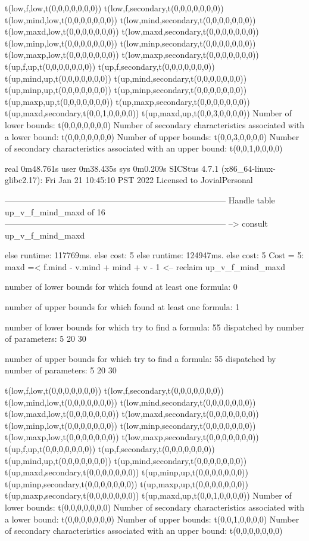 t(low,f,low,t(0,0,0,0,0,0,0))
t(low,f,secondary,t(0,0,0,0,0,0,0))
t(low,mind,low,t(0,0,0,0,0,0,0))
t(low,mind,secondary,t(0,0,0,0,0,0,0))
t(low,maxd,low,t(0,0,0,0,0,0,0))
t(low,maxd,secondary,t(0,0,0,0,0,0,0))
t(low,minp,low,t(0,0,0,0,0,0,0))
t(low,minp,secondary,t(0,0,0,0,0,0,0))
t(low,maxp,low,t(0,0,0,0,0,0,0))
t(low,maxp,secondary,t(0,0,0,0,0,0,0))
t(up,f,up,t(0,0,0,0,0,0,0))
t(up,f,secondary,t(0,0,0,0,0,0,0))
t(up,mind,up,t(0,0,0,0,0,0,0))
t(up,mind,secondary,t(0,0,0,0,0,0,0))
t(up,minp,up,t(0,0,0,0,0,0,0))
t(up,minp,secondary,t(0,0,0,0,0,0,0))
t(up,maxp,up,t(0,0,0,0,0,0,0))
t(up,maxp,secondary,t(0,0,0,0,0,0,0))
t(up,maxd,secondary,t(0,0,1,0,0,0,0))
t(up,maxd,up,t(0,0,3,0,0,0,0))
Number of lower bounds:                                             t(0,0,0,0,0,0,0)
Number of secondary characteristics associated with a lower bound:  t(0,0,0,0,0,0,0)
Number of upper bounds:                                             t(0,0,3,0,0,0,0)
Number of secondary characteristics associated with an upper bound: t(0,0,1,0,0,0,0)

real	0m48.761s
user	0m38.435s
sys	0m0.209s
SICStus 4.7.1 (x86_64-linux-glibc2.17): Fri Jan 21 10:45:10 PST 2022
Licensed to JovialPersonal


--------------------------------------------------------------------------------
Handle table up_v_f_mind_maxd of 16
--------------------------------------------------------------------------------
--> consult up_v_f_mind_maxd

else runtime: 117769ms. else cost: 5
else runtime: 124947ms. else cost: 5
Cost =  5:  maxd =< f.mind - v.mind + mind + v - 1 %
<-- reclaim up_v_f_mind_maxd

number of lower bounds for which found at least one formula: 0

number of upper bounds for which found at least one formula: 1

number of lower bounds for which try to find a formula: 55
dispatched by number of parameters: 5  20  30

number of upper bounds for which try to find a formula: 55
dispatched by number of parameters: 5  20  30

t(low,f,low,t(0,0,0,0,0,0,0))
t(low,f,secondary,t(0,0,0,0,0,0,0))
t(low,mind,low,t(0,0,0,0,0,0,0))
t(low,mind,secondary,t(0,0,0,0,0,0,0))
t(low,maxd,low,t(0,0,0,0,0,0,0))
t(low,maxd,secondary,t(0,0,0,0,0,0,0))
t(low,minp,low,t(0,0,0,0,0,0,0))
t(low,minp,secondary,t(0,0,0,0,0,0,0))
t(low,maxp,low,t(0,0,0,0,0,0,0))
t(low,maxp,secondary,t(0,0,0,0,0,0,0))
t(up,f,up,t(0,0,0,0,0,0,0))
t(up,f,secondary,t(0,0,0,0,0,0,0))
t(up,mind,up,t(0,0,0,0,0,0,0))
t(up,mind,secondary,t(0,0,0,0,0,0,0))
t(up,maxd,secondary,t(0,0,0,0,0,0,0))
t(up,minp,up,t(0,0,0,0,0,0,0))
t(up,minp,secondary,t(0,0,0,0,0,0,0))
t(up,maxp,up,t(0,0,0,0,0,0,0))
t(up,maxp,secondary,t(0,0,0,0,0,0,0))
t(up,maxd,up,t(0,0,1,0,0,0,0))
Number of lower bounds:                                             t(0,0,0,0,0,0,0)
Number of secondary characteristics associated with a lower bound:  t(0,0,0,0,0,0,0)
Number of upper bounds:                                             t(0,0,1,0,0,0,0)
Number of secondary characteristics associated with an upper bound: t(0,0,0,0,0,0,0)

